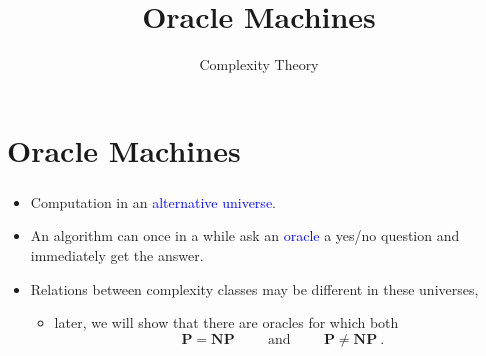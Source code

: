 \documentclass{beamer}
\title{Oracle Machines}
\author{Complexity Theory}
\date{}
\newcommand{\Pcl}{\mathsf{\mathbf{P}}}
\newcommand{\NPcl}{\mathsf{\mathbf{NP}}}
\newcommand{\hlbl}[1]{\textcolor{blue}{#1}}
\begin{document}
  
\begin{frame}[plain]
  \titlepage
\end{frame}

\section{Oracle Machines}\label{}

\begin{frame}
  \frametitle{\insertsection}
  \begin{itemize}
    \item  Computation in an \hlbl{alternative universe}.
    \item  An algorithm can once in a while ask an \hlbl{oracle} a yes/no
      question and immediately get the answer.
    \item  Relations between complexity classes may be different in these
      universes,
      \begin{itemize}
        \item  later, we will show that there are oracles for which both
          \begin{equation*}
            \Pcl = \NPcl \hspace{1cm} \mbox{and} \hspace{1cm} \Pcl \neq \NPcl~.
          \end{equation*}
      \end{itemize}
  \end{itemize}
\end{frame}
\end{document}
